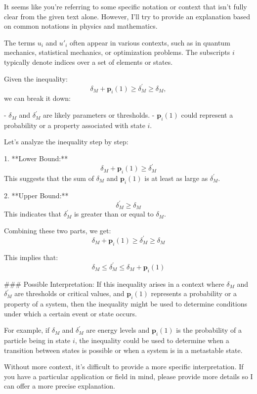 It seems like you're referring to some specific notation or context that isn't fully clear from the given text alone. However, I'll try to provide an explanation based on common notations in physics and mathematics.

The terms \( u_i \) and \( u'_i \) often appear in various contexts, such as in quantum mechanics, statistical mechanics, or optimization problems. The subscripts \( i \) typically denote indices over a set of elements or states.

Given the inequality:
\[
\delta_M + \mathbf{p}_i(1) \geq \delta^{\prime}_M \geq \delta_M,
\]
we can break it down:

- \(\delta_M\) and \(\delta^{\prime}_M\) are likely parameters or thresholds.
- \(\mathbf{p}_i(1)\) could represent a probability or a property associated with state \( i \).

Let's analyze the inequality step by step:

1. **Lower Bound:**
   \[
   \delta_M + \mathbf{p}_i(1) \geq \delta^{\prime}_M
   \]
   This suggests that the sum of \(\delta_M\) and \(\mathbf{p}_i(1)\) is at least as large as \(\delta^{\prime}_M\).

2. **Upper Bound:**
   \[
   \delta^{\prime}_M \geq \delta_M
   \]
   This indicates that \(\delta^{\prime}_M\) is greater than or equal to \(\delta_M\).

Combining these two parts, we get:
\[
\delta_M + \mathbf{p}_i(1) \geq \delta^{\prime}_M \geq \delta_M
\]

This implies that:
\[
\delta_M \leq \delta^{\prime}_M \leq \delta_M + \mathbf{p}_i(1)
\]

### Possible Interpretation:
If this inequality arises in a context where \(\delta_M\) and \(\delta^{\prime}_M\) are thresholds or critical values, and \(\mathbf{p}_i(1)\) represents a probability or a property of a system, then the inequality might be used to determine conditions under which a certain event or state occurs.

For example, if \(\delta_M\) and \(\delta^{\prime}_M\) are energy levels and \(\mathbf{p}_i(1)\) is the probability of a particle being in state \( i \), the inequality could be used to determine when a transition between states is possible or when a system is in a metastable state.

Without more context, it's difficult to provide a more specific interpretation. If you have a particular application or field in mind, please provide more details so I can offer a more precise explanation.